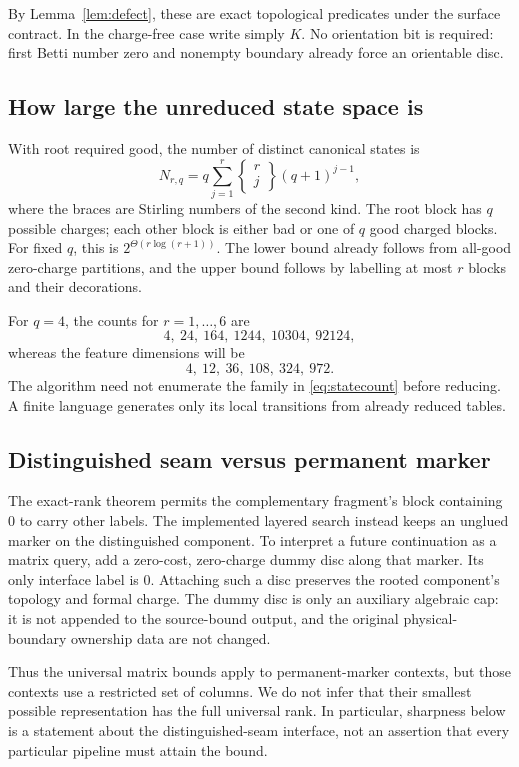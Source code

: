 \documentclass[11pt,letterpaper]{article}
\theoremstyle{definition}
\begin{document}
By Lemma~\ref{lem:defect}, these are exact topological predicates under the surface contract. In the charge-free case write simply $K$. No orientation bit is required: first Betti number zero and nonempty boundary already force an orientable disc.

\subsection{How large the unreduced state space is}
With root required good, the number of distinct canonical states is
\begin{equation}
 N_{r,q}=q\sum_{j=1}^{r}\left\{\begin{matrix}r\\j\end{matrix}\right\}(q+1)^{j-1},\label{eq:statecount}
\end{equation}
where the braces are Stirling numbers of the second kind. The root block has $q$ possible charges; each other block is either bad or one of $q$ good charged blocks. For fixed $q$, this is $2^{\Theta(r\log(r+1))}$. The lower bound already follows from all-good zero-charge partitions, and the upper bound follows by labelling at most $r$ blocks and their decorations.

For $q=4$, the counts for $r=1,\ldots,6$ are
\[
 4,\ 24,\ 164,\ 1244,\ 10304,\ 92124,
\]
whereas the feature dimensions will be
\[
 4,\ 12,\ 36,\ 108,\ 324,\ 972.
\]
The algorithm need not enumerate the family in \eqref{eq:statecount} before reducing. A finite language generates only its local transitions from already reduced tables.

\subsection{Distinguished seam versus permanent marker}\label{sec:marker}
The exact-rank theorem permits the complementary fragment's block containing $0$ to carry other labels. The implemented layered search instead keeps an unglued marker on the distinguished component. To interpret a future continuation as a matrix query, add a zero-cost, zero-charge dummy disc along that marker. Its only interface label is $0$. Attaching such a disc preserves the rooted component's topology and formal charge. The dummy disc is only an auxiliary algebraic cap: it is not appended to the source-bound output, and the original physical-boundary ownership data are not changed.

Thus the universal matrix bounds apply to permanent-marker contexts, but those contexts use a restricted set of columns. We do not infer that their smallest possible representation has the full universal rank. In particular, sharpness below is a statement about the distinguished-seam interface, not an assertion that every particular pipeline must attain the bound.
\end{document}
